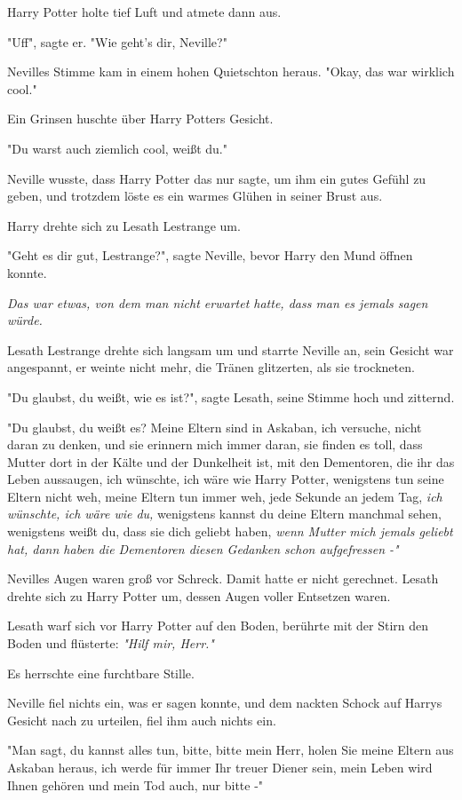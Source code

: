 {Harry Potter holte tief Luft und atmete dann aus.

"Uff", sagte er. "Wie geht's dir, Neville?"

Nevilles Stimme kam in einem hohen Quietschton heraus. "Okay, das war wirklich cool."

Ein Grinsen huschte über Harry Potters Gesicht.

"Du warst auch ziemlich cool, weißt du."

Neville wusste, dass Harry Potter das nur sagte, um ihm ein gutes Gefühl zu geben, und trotzdem löste es ein warmes Glühen in seiner Brust aus.

Harry drehte sich zu Lesath Lestrange um.

"Geht es dir gut, Lestrange?", sagte Neville, bevor Harry den Mund öffnen konnte.

\emph{Das war etwas, von dem man nicht erwartet hatte, dass man es jemals sagen würde.}

Lesath Lestrange drehte sich langsam um und starrte Neville an, sein Gesicht war angespannt, er weinte nicht mehr, die Tränen glitzerten, als sie trockneten.

"Du glaubst, du weißt, wie es ist?", sagte Lesath, seine Stimme hoch und zitternd.

"Du glaubst, du weißt es? Meine Eltern sind in Askaban, ich versuche, nicht daran zu denken, und sie erinnern mich immer daran, sie finden es toll, dass Mutter dort in der Kälte und der Dunkelheit ist, mit den Dementoren, die ihr das Leben aussaugen, ich wünschte, ich wäre wie Harry Potter, wenigstens tun seine Eltern nicht weh, meine Eltern tun immer weh, jede Sekunde an jedem Tag, \emph{ich wünschte, ich wäre wie du,} wenigstens kannst du deine Eltern manchmal sehen, wenigstens weißt du, dass sie dich geliebt haben, \emph{wenn Mutter mich jemals geliebt hat, dann haben die Dementoren diesen Gedanken schon aufgefressen -"}

Nevilles Augen waren groß vor Schreck. Damit hatte er nicht gerechnet. Lesath drehte sich zu Harry Potter um, dessen Augen voller Entsetzen waren.

Lesath warf sich vor Harry Potter auf den Boden, berührte mit der Stirn den Boden und flüsterte: \emph{"Hilf mir, Herr."}

Es herrschte eine furchtbare Stille.

Neville fiel nichts ein, was er sagen konnte, und dem nackten Schock auf Harrys Gesicht nach zu urteilen, fiel ihm auch nichts ein.

"Man sagt, du kannst alles tun, bitte, bitte mein Herr, holen Sie meine Eltern aus Askaban heraus, ich werde für immer Ihr treuer Diener sein, mein Leben wird Ihnen gehören und mein Tod auch, nur bitte -"

}
